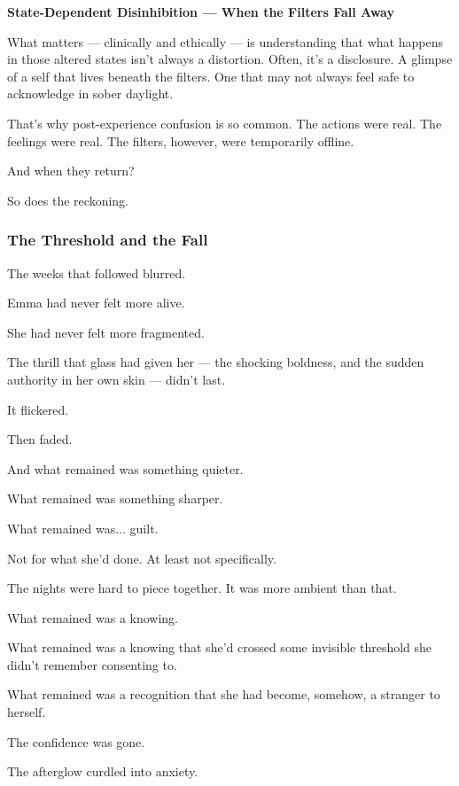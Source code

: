 \begin{TechnicalSidebar}{\textbf{State-Dependent Disinhibition — When the Filters Fall Away}}
  \medskip

  What matters — clinically and ethically — is understanding that what happens in those altered 
  states isn’t always a distortion. Often, it’s a disclosure. A glimpse of a self that lives beneath 
  the filters. One that may not always feel safe to acknowledge in sober daylight.

  \medskip
  
  That’s why post-experience confusion is so common. The actions were real. The feelings were real. 
  The filters, however, were temporarily offline.

  \medskip
  
  And when they return?

  \medskip
  
  So does the reckoning.
  
\end{TechnicalSidebar}

\subsubsection{The Threshold and the Fall}

The weeks that followed blurred.

Emma had never felt more alive.

She had never felt more fragmented. 

The thrill that glass had given her --- the shocking 
boldness, and the sudden authority in her own skin --- didn’t last.  

It flickered. 

Then faded. 

And what remained was something quieter. 

What remained was something sharper.

What remained was... guilt.

Not for what she’d done. At least not specifically. 

The nights were hard to piece together. 
It was more ambient than that. 

What remained was a knowing. 

What remained was a knowing that she'd crossed some invisible threshold she didn’t 
remember consenting to. 

What remained was a recognition that she had become, somehow, a stranger to herself.

The confidence was gone.

The afterglow curdled into anxiety. 

